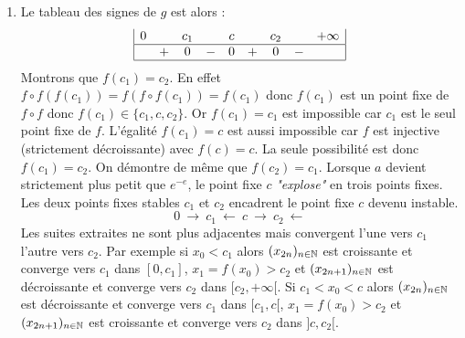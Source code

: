 \begin{enumerate}
\begin{enumerate}
\item Le tableau des signes de $g$ est alors :
\[
\begin{array}{|lcccccccr|}
0 & &c_1& &c& &c_2& &+\infty \\ \hline
  &+&0  &-&0&+&0  &-& \\
\hline
\end{array}
\]
Montrons que $f(c_1)=c_2$.\newline
En effet $f\circ f(f(c_1))=f(f\circ f(c_1))=f(c_1)$ donc $f(c_1)$ est un point fixe de $f\circ f$ donc $f(c_1)\in\{c_1,c,c_2\}$. Or $f(c_1)=c_1$ est impossible car $c_1$ est le seul point fixe de $f$. L'égalité $f(c_1)=c$ est aussi impossible car $f$ est injective (strictement décroissante) avec $f(c)=c$. La seule possibilité est donc $f(c_1)=c_2$. On démontre de même que $f(c_2)=c_1$.\newline
Lorsque $a$ devient strictement plus petit que $e^{-e}$, le point fixe $c$ \emph{"explose"} en trois points fixes. Les deux points fixes stables $c_1$ et $c_2$ encadrent le point fixe $c$ devenu instable.
\[0\:\rightarrow \: c_1  \: \leftarrow \: c \: \rightarrow \: c_2 \: \leftarrow\]
Les suites extraites ne sont plus adjacentes mais convergent l'une vers $c_1$ l'autre vers $c_2$.\newline
Par exemple si $x_0<c_1$ alors $(x_{2n})_{n\in\mathbb{N}}$ est croissante et converge vers $c_1$ dans $[0,c_1]$, $x_1=f(x_0)>c_2$ et $(x_{2n+1})_{n\in\mathbb{N}}$ est décroissante et converge vers $c_2$ dans $[c_2,+\infty[$.\newline
Si $c_1<x_0<c$ alors $(x_{2n})_{n\in\mathbb{N}}$ est décroissante et converge vers $c_1$ dans $[c_1,c[$, $x_1=f(x_0)>c_2$ et $(x_{2n+1})_{n\in\mathbb{N}}$ est croissante et converge vers $c_2$ dans $]c,c_2[$.
\end{enumerate}

\end{enumerate}
